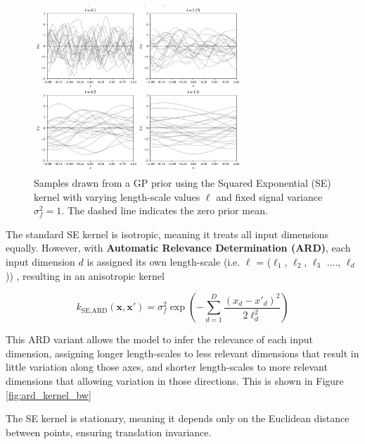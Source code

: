 \documentclass{ut-thesis}
\begin{document}
\begin{figure}[htbp]
    \centering
    \includegraphics[width=0.7\textwidth]{rbf.png}
    \caption[Samples drawn from a Gaussian Process prior using the Squared Exponential (SE) kernel 
    with varying length-scale values \( \ell \) and fixed signal variance \( \sigma_f^2 = 1 \).]{Samples drawn from a GP prior using the Squared Exponential (SE) kernel 
    with varying length-scale values \( \ell \) and fixed signal variance \( \sigma_f^2 = 1 \). The dashed line indicates the zero prior mean.}
    \label{fig:gp_samples}
\end{figure}

\newpage
The standard SE kernel is isotropic, meaning it treats all input dimensions equally. However, with \textbf{Automatic Relevance Determination (ARD)}, each input dimension \( d \) is assigned its own length-scale (i.e. $\ell$  = ($\ell_1$, $\ell_2$, $\ell_3$ ...., $\ell_d$)) , resulting in an anisotropic kernel

\begin{equation}
    k_{\text{SE,ARD}}(\mathbf{x}, \mathbf{x'}) = \sigma_f^2 \exp\left( -\sum_{d=1}^{D} \frac{(x_d - x'_d)^2}{2\ell_d^2} \right)
\end{equation}

This ARD variant allows the model to infer the relevance of each input dimension, assigning longer length-scales to less relevant dimensions that result in little variation along those axes, and shorter length-scales to more relevant dimensions that allowing variation in those directions. This is shown in Figure \ref{fig:ard_kernel_bw}

The SE kernel is stationary, meaning it depends only on the Euclidean distance between points, ensuring translation invariance.
\end{document}
